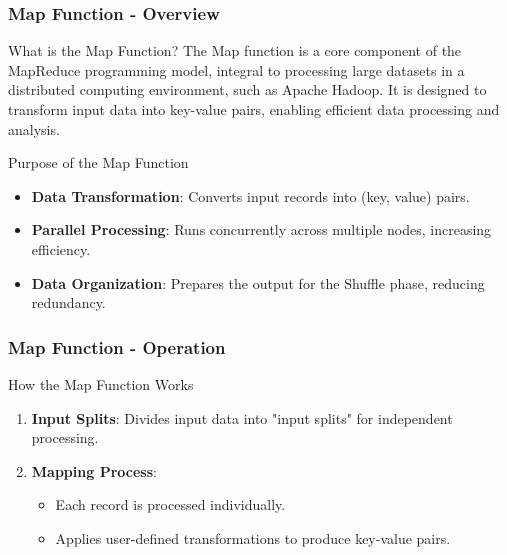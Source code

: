 \documentclass[aspectratio=169]{beamer}
\begin{document}
\begin{frame}[fragile]
    \frametitle{Map Function - Overview}
    \begin{block}{What is the Map Function?}
        The Map function is a core component of the MapReduce programming model, integral to processing large datasets in a distributed computing environment, such as Apache Hadoop. It is designed to transform input data into key-value pairs, enabling efficient data processing and analysis.
    \end{block}

    \begin{block}{Purpose of the Map Function}
        \begin{itemize}
            \item \textbf{Data Transformation}: Converts input records into (key, value) pairs.
            \item \textbf{Parallel Processing}: Runs concurrently across multiple nodes, increasing efficiency.
            \item \textbf{Data Organization}: Prepares the output for the Shuffle phase, reducing redundancy.
        \end{itemize}
    \end{block}
\end{frame}

\begin{frame}[fragile]
    \frametitle{Map Function - Operation}
    \begin{block}{How the Map Function Works}
        \begin{enumerate}
            \item \textbf{Input Splits}: Divides input data into "input splits" for independent processing.
            \item \textbf{Mapping Process}:
            \begin{itemize}
                \item Each record is processed individually.
                \item Applies user-defined transformations to produce key-value pairs.
            \end{itemize}
        \end{enumerate}
    \end{block}
\end{frame}
\end{document}
